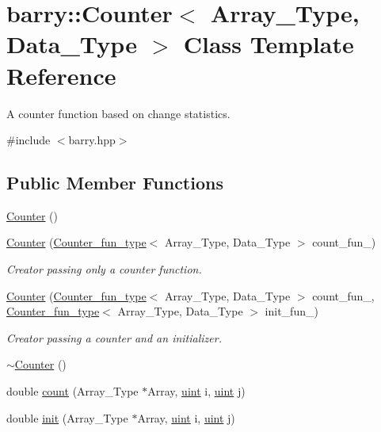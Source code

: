 \hypertarget{classbarry_1_1_counter}{}\section{barry\+:\+:Counter$<$ Array\+\_\+\+Type, Data\+\_\+\+Type $>$ Class Template Reference}
\label{classbarry_1_1_counter}


A counter function based on change statistics.  




{\ttfamily \#include $<$barry.\+hpp$>$}

\subsection*{Public Member Functions}
\begin{DoxyCompactItemize}
\item 
\hyperlink{classbarry_1_1_counter_a3c990d6dbcdc553b3179c8353497a7df}{Counter} ()
\item 
\hyperlink{classbarry_1_1_counter_a33a032bc90384bf0e4178daeded5b10c}{Counter} (\hyperlink{namespacebarry_abaaae3200da8e4b7faac3c04fe9c3081}{Counter\+\_\+fun\+\_\+type}$<$ Array\+\_\+\+Type, Data\+\_\+\+Type $>$ count\+\_\+fun\+\_\+)
\begin{DoxyCompactList}\small\item\em Creator passing only a counter function. \end{DoxyCompactList}\item 
\hyperlink{classbarry_1_1_counter_a19668015222fd41f127e961c17f7a609}{Counter} (\hyperlink{namespacebarry_abaaae3200da8e4b7faac3c04fe9c3081}{Counter\+\_\+fun\+\_\+type}$<$ Array\+\_\+\+Type, Data\+\_\+\+Type $>$ count\+\_\+fun\+\_\+, \hyperlink{namespacebarry_abaaae3200da8e4b7faac3c04fe9c3081}{Counter\+\_\+fun\+\_\+type}$<$ Array\+\_\+\+Type, Data\+\_\+\+Type $>$ init\+\_\+fun\+\_\+)
\begin{DoxyCompactList}\small\item\em Creator passing a counter and an initializer. \end{DoxyCompactList}\item 
\hyperlink{classbarry_1_1_counter_ad899c3d55bb15e76ed7df05006e88b38}{$\sim$\+Counter} ()
\item 
double \hyperlink{classbarry_1_1_counter_afe1d23e72c3bdca9b2481f36ebde1d95}{count} (Array\+\_\+\+Type $\ast$Array, \hyperlink{namespacebarry_a11dfc53ddb4672278319aa04f1e09a6c}{uint} i, \hyperlink{namespacebarry_a11dfc53ddb4672278319aa04f1e09a6c}{uint} j)
\item 
double \hyperlink{classbarry_1_1_counter_ae0451979ddc51a5fbf00de78c37d3216}{init} (Array\+\_\+\+Type $\ast$Array, \hyperlink{namespacebarry_a11dfc53ddb4672278319aa04f1e09a6c}{uint} i, \hyperlink{namespacebarry_a11dfc53ddb4672278319aa04f1e09a6c}{uint} j)
\end{DoxyCompactItemize}
